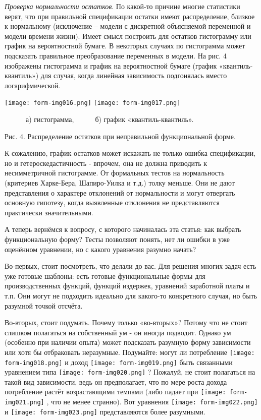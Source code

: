 \documentclass[a4paper]{article}
\begin{document}
\textit{Проверка нормальности остатков}. По какой-то причине многие статистики верят, что при правильной спецификации остатки имеют распределение, близкое к нормальному (исключение – модели с дискретной объясняемой переменной и модели времени жизни). Имеет смысл построить для остатков гистограмму или график на вероятностной бумаге. В некоторых случаях по гистограмма может подсказать правильное преобразование переменных в модели. На рис. 4 изображены гистограмма и график на вероятностной бумаге (график «квантиль-квантиль») для случая, когда линейная зависимость подгонялась вместо логарифмической.


\bigskip

{\centering  \texttt{[image: form-img016.png]}  \texttt{[image: form-img017.png]} \par}
\ \ \ \ \ \ а) гистограмма,\ \ \ \ \ \ б) график «квантиль-квантиль».

{\centering
Рис. 4. Распределение остатков при неправильной функциональной форме.
\par}


\bigskip

К сожалению, график остатков может искажать не только ошибка спецификации, но и гетероскедастичность - впрочем, она не должна приводить к несимметричной гистограмме. От формальных тестов на нормальность (критериев Харке-Бера, Шапиро-Уилка и т.д.) толку меньше. Они не дают представления о характере отклонений от нормальности и могут отвергать основную гипотезу, когда выявленные отклонения не представляются практически значительными.

А теперь вернёмся к вопросу, с которого начиналась эта статья: как выбрать функциональную форму? Тесты позволяют понять, нет ли ошибки в уже оценённом уравнении, но с какого уравнения разумно начать?

Во-первых, стоит посмотреть, что делали до вас. Для решения многих задач есть уже готовые шаблоны: есть готовые функциональные формы для производственных функций, функций издержек, уравнений заработной платы и т.п. Они могут не подходить идеально для какого-то конкретного случая, но быть разумной точкой отсчёта.

Во-вторых, стоит подумать. Почему только «во-вторых»? Потому что не стоит слишком полагаться на собственный ум - он иногда подводит. Однако ум (особенно при наличии опыта) может подсказать разумную форму зависимости или хотя бы отбраковать неразумные. Подумайте: могут ли потребление  \texttt{[image: form-img018.png]}  и доход  \texttt{[image: form-img019.png]}  быть связанными уравнением типа  \texttt{[image: form-img020.png]} ? Пожалуй, не стоит полагаться на такой вид зависимости, ведь он предполагает, что по мере роста дохода потребление растёт возрастающими темпами (либо падает при  \texttt{[image: form-img021.png]} , что не менее странно). Вот уравнения  \texttt{[image: form-img022.png]}  и  \texttt{[image: form-img023.png]}  представляются более разумными.
\end{document}
